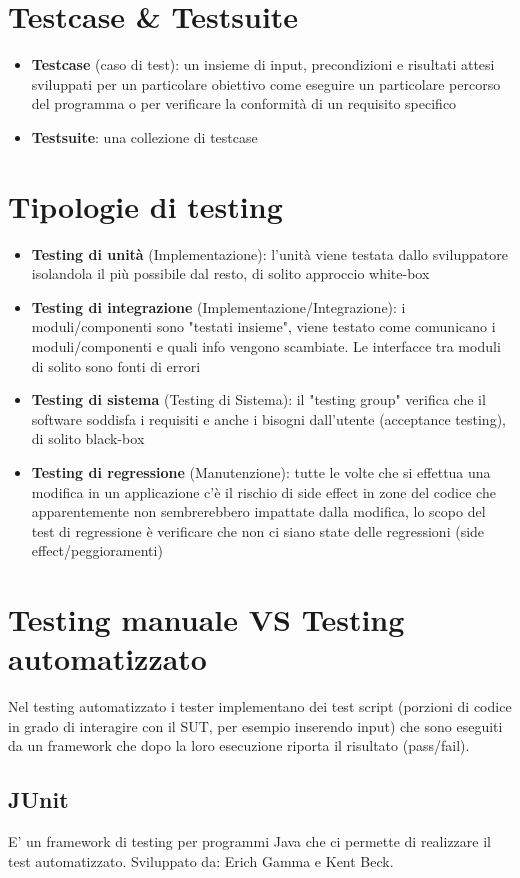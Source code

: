 \documentclass[12pt, a4paper]{report}
\begin{document}
\section{Testcase \& Testsuite}
\begin{itemize}
    \item \textbf{Testcase} (caso di test): un insieme di input, precondizioni e risultati attesi sviluppati per un particolare obiettivo come eseguire un particolare percorso del programma o per verificare la conformità di un requisito specifico
    \item \textbf{Testsuite}: una collezione di testcase
\end{itemize}
\section{Tipologie di testing}
\begin{itemize}
    \item \textbf{Testing di unità} (Implementazione): l'unità viene testata dallo sviluppatore isolandola il più possibile dal resto, di solito approccio white-box
    \item \textbf{Testing di integrazione} (Implementazione/Integrazione): i moduli/componenti sono "testati insieme", viene testato come comunicano i moduli/componenti e quali info vengono scambiate. Le interfacce tra moduli di solito sono fonti di errori
    \item \textbf{Testing di sistema} (Testing di Sistema): il "testing group" verifica che il software soddisfa i requisiti e anche i bisogni dall'utente (acceptance testing), di solito black-box
    \item \textbf{Testing di regressione} (Manutenzione): tutte le volte che si effettua una modifica in un applicazione c'è il rischio di side effect in zone del codice che apparentemente non sembrerebbero impattate dalla modifica, lo scopo del test di regressione è verificare che non ci siano state delle regressioni (side effect/peggioramenti)
\end{itemize}
\section{Testing manuale VS Testing automatizzato}
Nel testing automatizzato i tester implementano dei test script (porzioni di codice in grado di interagire con il SUT, per esempio inserendo input) che sono eseguiti da un framework che dopo la loro esecuzione riporta il risultato (pass/fail).
\subsection{JUnit}
E' un framework di testing per programmi Java che ci permette di realizzare il test automatizzato. Sviluppato da: Erich Gamma e Kent Beck.
\end{document}
